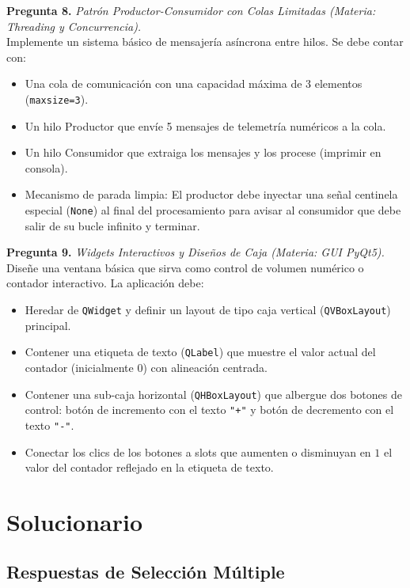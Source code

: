 \documentclass[12pt,letterpaper]{article}
\begin{document}
\bigskip

\textbf{Pregunta 8.} \textit{Patrón Productor-Consumidor con Colas Limitadas (Materia: Threading y Concurrencia).} \\
Implemente un sistema básico de mensajería asíncrona entre hilos. Se debe contar con:
\begin{itemize}
  \item Una cola de comunicación con una capacidad máxima de 3 elementos (\texttt{maxsize=3}).
  \item Un hilo Productor que envíe 5 mensajes de telemetría numéricos a la cola.
  \item Un hilo Consumidor que extraiga los mensajes y los procese (imprimir en consola).
  \item Mecanismo de parada limpia: El productor debe inyectar una señal centinela especial (\texttt{None}) al final del procesamiento para avisar al consumidor que debe salir de su bucle infinito y terminar.
\end{itemize}

\bigskip

\textbf{Pregunta 9.} \textit{Widgets Interactivos y Diseños de Caja (Materia: GUI PyQt5).} \\
Diseñe una ventana básica que sirva como control de volumen numérico o contador interactivo.
La aplicación debe:
\begin{itemize}
  \item Heredar de \texttt{QWidget} y definir un layout de tipo caja vertical (\texttt{QVBoxLayout}) principal.
  \item Contener una etiqueta de texto (\texttt{QLabel}) que muestre el valor actual del contador (inicialmente $0$) con alineación centrada.
  \item Contener una sub-caja horizontal (\texttt{QHBoxLayout}) que albergue dos botones de control: botón de incremento con el texto \texttt{"+"} y botón de decremento con el texto \texttt{"-"}.
  \item Conectar los clics de los botones a slots que aumenten o disminuyan en $1$ el valor del contador reflejado en la etiqueta de texto.
\end{itemize}

\pagebreak

\section*{Solucionario}

\subsection*{Respuestas de Selección Múltiple}
\end{document}

